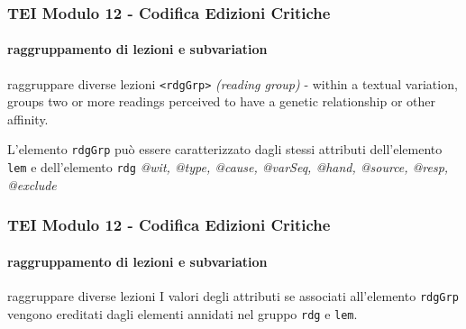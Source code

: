 \begin{frame}
    \frametitle{TEI Modulo 12 - Codifica Edizioni Critiche}
    \framesubtitle{raggruppamento di lezioni e subvariation}
    \addtocounter{nframe}{1}





   

    \begin{block}{raggruppare diverse lezioni}
        \texttt{<rdgGrp>} \textit{(reading group)} - within a textual variation, groups two or more readings perceived to have a genetic relationship or other affinity.
    \end{block}

    \begin{center}
       L'elemento \texttt{rdgGrp} può essere caratterizzato dagli stessi attributi dell'elemento \texttt{lem} e dell'elemento \texttt{rdg} \textit{@wit, @type, @cause, @varSeq, @hand, @source, @resp, @exclude}
    \end{center}

\end{frame}


\begin{frame}
    \frametitle{TEI Modulo 12 - Codifica Edizioni Critiche}
    \framesubtitle{raggruppamento di lezioni e subvariation}
    \addtocounter{nframe}{1}

   

    \begin{block}{raggruppare diverse lezioni}
        I valori degli attributi se associati all'elemento \texttt{rdgGrp} vengono ereditati dagli elementi annidati nel gruppo \texttt{rdg} e \texttt{lem}.
    \end{block}


\end{frame}


